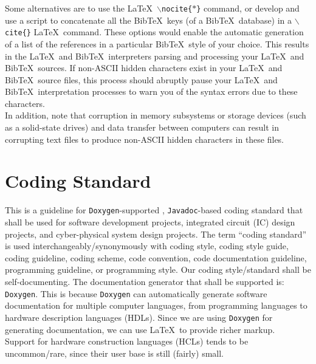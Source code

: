 \documentclass[letter,12pt]{article}
\begin{document}
Some alternatives are to use the \LaTeX\ {\tt $\backslash$nocite\{$\ast$\}} command, or develop and use a script to concatenate all the {\sc Bib}\TeX\ keys (of a {\sc Bib}\TeX\ database) in a {\tt $\backslash$cite\{\}} \LaTeX\ command. These options would enable the automatic generation of a list of the references in a particular {\sc Bib}\TeX\ style of your choice. This results in the \LaTeX\ and {\sc Bib}\TeX\ interpreters parsing and processing your \LaTeX\ and {\sc Bib}\TeX\ sources. If non-ASCII hidden characters exist in your \LaTeX\ and {\sc Bib}\TeX\ source files, this process should abruptly pause your \LaTeX\ and {\sc Bib}\TeX\ interpretation processes to warn you of the syntax errors due to these characters. \\

In addition, note that corruption in memory subsystems or storage devices (such as a solid-state drives) and data transfer between computers can result in corrupting text files to produce non-ASCII hidden characters in these files.





\section{Coding Standard}
\label{sec:CodingStandard}

This is a guideline for {\tt Doxygen}-supported \cite{vanHeesch2016}, {\tt Javadoc}-based \cite{Long1995} coding standard that shall be used for software development projects, integrated circuit (IC) design projects, and cyber-physical system design projects. The term ``coding standard'' is used interchangeably/synonymously with coding style, coding style guide, coding guideline, coding scheme, code convention, code documentation guideline, programming guideline, or programming style. Our coding style/standard shall be self-documenting. The documentation generator that shall be supported is: {\tt Doxygen}. This is because {\tt Doxygen} can automatically generate software documentation for multiple computer languages, from programming languages to hardware description languages (HDLs). Since we are using {\tt Doxygen} for generating documentation, we can use \LaTeX\ to provide richer markup. \\

Support for hardware construction languages (HCLs) tends to be uncommon/rare, since their user base is still (fairly) small. 
\end{document}

